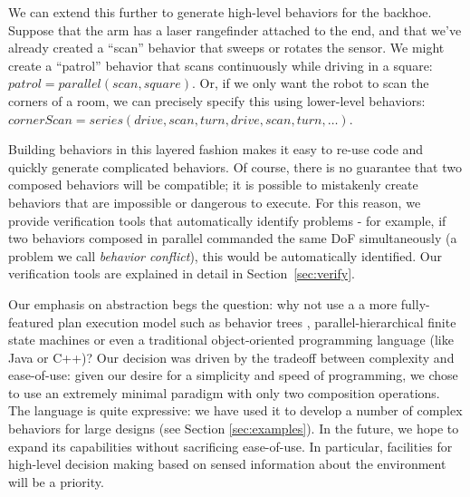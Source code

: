 \documentclass[graybox]{svmult}
\begin{document}
We can extend this further to generate high-level behaviors for the
backhoe.  Suppose that the arm has a laser rangefinder attached to the end,
and that we've already created a ``scan'' behavior that sweeps or rotates the
sensor.  We might create a ``patrol'' behavior that scans continuously while
driving in a square: \(patrol = parallel( scan, square)\). Or, if we only want
the robot to scan the corners of a room, we can precisely specify this using
lower-level behaviors:  \(cornerScan=series(drive, scan, turn, drive,scan,
turn, \ldots) \).


Building behaviors in this layered fashion makes it easy to re-use code and
quickly generate complicated behaviors. Of course, there is no guarantee that
two composed behaviors will be compatible; it is possible to mistakenly create
behaviors that are impossible or dangerous to execute. For this reason, we provide
verification tools that automatically identify problems - for example, if two
behaviors composed in parallel commanded the same DoF simultaneously (a problem
we call \textit{behavior conflict}),  this
would be automatically identified. Our verification tools are explained in detail
in Section~\ref{sec:verify}.

Our emphasis on abstraction begs the question: why not use  a a more fully-featured
plan execution model such as behavior trees \cite{marzinotto2014towards}, parallel-hierarchical
finite state machines \cite{sklyarov2008design} or even a
traditional object-oriented programming language (like Java or C++)?  Our
decision was driven by the tradeoff between complexity and ease-of-use: given
our desire for a simplicity and speed of programming, we chose to use an
extremely minimal  paradigm with only two composition operations.
The language is quite expressive: we have used it to develop a number of  complex behaviors
for large designs (see Section \ref{sec:examples}). In the future, we hope to expand
its capabilities without sacrificing ease-of-use.  In particular, facilities
for high-level decision making based on sensed information about the environment
will be a priority.
\end{document}
